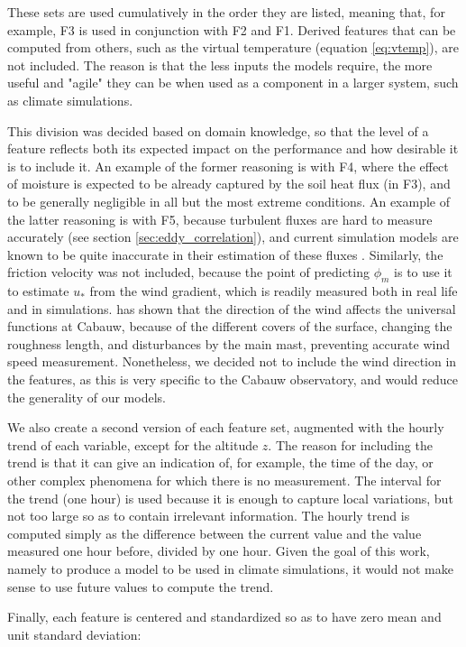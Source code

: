 \documentclass[a4paper]{book}
\begin{document}
These sets are used cumulatively in the order they are listed, meaning that, for example, F3 is used in conjunction with F2 and F1. Derived features that can be computed from others, such as the virtual temperature (equation \ref{eq:vtemp}), are not included. The reason is that the less inputs the models require, the more useful and "agile" they can be when used as a component in a larger system, such as climate simulations.

This division was decided based on domain knowledge, so that the level of a feature reflects both its expected impact on the performance and how desirable it is to include it. An example of the former reasoning is with F4, where the effect of moisture is expected to be already captured by the soil heat flux (in F3), and to be generally negligible in all but the most extreme conditions. An example of the latter reasoning is with F5, because turbulent fluxes are hard to measure accurately (see section \ref{sec:eddy_correlation}), and current simulation models are known to be quite inaccurate in their estimation of these fluxes \citep{sheba}. Similarly, the friction velocity was not included, because the point of predicting $\phi_m$ is to use it to estimate $u_*$ from the wind gradient, which is readily measured both in real life and in simulations. \cite{cabauw_z0} has shown that the direction of the wind affects the universal functions at Cabauw, because of the different covers of the surface, changing the roughness length, and disturbances by the main mast, preventing accurate wind speed measurement. Nonetheless, we decided not to include the wind direction in the features, as this is very specific to the Cabauw observatory, and would reduce the generality of our models.

We also create a second version of each feature set, augmented with the hourly trend of each variable, except for the altitude $z$. The reason for including the trend is that it can give an indication of, for example, the time of the day, or other complex phenomena for which there is no measurement. The interval for the trend (one hour) is used because it is enough to capture local variations, but not too large so as to contain irrelevant information. The hourly trend is computed simply as the difference between the current value and the value measured one hour before, divided by one hour. Given the goal of this work, namely to produce a model to be used in climate simulations, it would not make sense to use future values to compute the trend.

Finally, each feature is centered and standardized so as to have zero mean and unit standard deviation:
\end{document}
